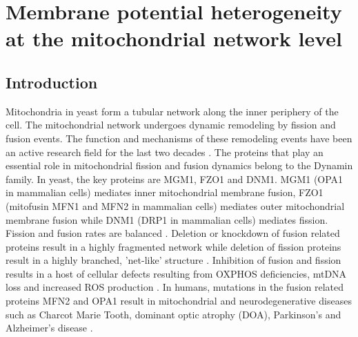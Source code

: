 \chapter{Membrane potential heterogeneity at the mitochondrial network level}\label{ch:five}
\clearpage
\section{Introduction}
Mitochondria in yeast form a tubular network along the inner periphery of the cell. The mitochondrial network undergoes dynamic remodeling by fission and fusion events. The function and mechanisms of these remodeling events have been an active research field for the last two decades \cite{hoitzing_what_2015}. The proteins that play an essential role in mitochondrial fission and fusion dynamics belong to the Dynamin family. In yeast, the key proteins are MGM1, FZO1 and DNM1. MGM1 (OPA1 in mammalian cells) mediates inner mitochondrial membrane fusion, FZO1 (mitofusin MFN1 and MFN2 in mammalian cells) mediates outer mitochondrial membrane fusion while DNM1 (DRP1 in mammalian cells) mediates fission. Fission and fusion rates are balanced \cite{shaw_mitochondrial_2002}. Deletion or knockdown of fusion related proteins result in a highly fragmented network while deletion of fission proteins result in a highly branched, 'net-like' structure \cite{shaw_mitochondrial_2002}. Inhibition of fusion and fission results in a host of cellular defects resulting from OXPHOS deficiencies, mtDNA loss and increased ROS production \cite{chen_disruption_2005,ishihara_regulation_2006,nunnari_mitochondria:_2012}. In humans, mutations in the fusion related proteins MFN2 and OPA1 result in mitochondrial and neurodegenerative diseases such as Charcot Marie Tooth, dominant optic atrophy (DOA), Parkinson's and Alzheimer's disease \cite{alexander_opa1_2000,bliek_mechanisms_2013,wang_impaired_2009}.

